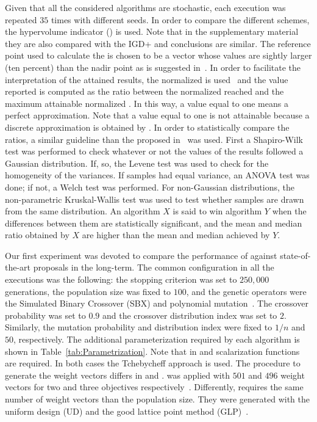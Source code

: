 Given that all the considered algorithms are stochastic, each execution was repeated $35$ times with different seeds.
%
In order to compare the different schemes, the hypervolume indicator (\HV{}) is used.
%
Note that in the supplementary material they are also compared with the IGD+ and conclusions are similar.
%
The reference point used to calculate the \HV{} is chosen to be a vector whose values are sightly larger (ten percent) than the nadir point 
as is suggested in~\cite{ishibuchi2017reference}.
%
In order to facilitate the interpretation of the attained results, the normalized \HV{} is used~\cite{li2015evolutionary}
and the value reported is computed as the ratio between the normalized \HV{} reached and the maximum attainable 
normalized \HV{}.
%
In this way, a value equal to one means a perfect approximation.
%
Note that a value equal to one is not attainable because a discrete approximation is obtained by \MOEAS{}.
%
In order to statistically compare the \HV{} ratios, a similar guideline than the proposed in~\cite{Joel:StatisticalTest} was used. 
%
First a Shapiro-Wilk test was performed to check whatever or not the values of the results followed a Gaussian distribution. 
%
If, so, the Levene test was used to check for the homogeneity of the variances. 
%
If samples had equal variance, an ANOVA test was done; if not, a Welch test was performed. 
%
For non-Gaussian distributions, the non-parametric Kruskal-Wallis test was used to test whether samples are drawn from the same distribution. 
%
An algorithm $X$ is said to win algorithm $Y$ when the differences between them are statistically significant, and the mean and median \HV{} ratio 
obtained by $X$ are higher than the mean and median achieved by $Y$.

Our first experiment was devoted to compare the performance of \VSDMOEA{} against state-of-the-art proposals in the long-term.
%
The common configuration in all the executions was the following: the stopping criterion was set to $250,000$ generations, 
the population size was fixed to $100$, and the genetic operators were the Simulated Binary Crossover (SBX) and polynomial 
mutation~\cite{Joel:SBX1994, Joel:Mutation}.
%
The crossover probability was set to $0.9$ and the crossover distribution index was set to $2$.
%
Similarly, the mutation probability and distribution index were fixed to $1/n$ and $50$, respectively.
%
The additional parameterization required by each algorithm is shown in Table~\ref{tab:Parametrization}.
%
Note that in \MOEAD{} and \RMOEA{} scalarization functions are required.
%
In both cases the Tchebycheff approach is used.
%
The procedure to generate the weight vectors differs in \MOEAD{} and \RMOEA{}.
%
\RMOEA{} was applied with $501$ and $496$ weight vectors for two and three objectives respectively~\cite{trautmann2013r2}.
%
Differently, \MOEAD{} requires the same number of weight vectors than the population size.
%
They were generated with the uniform design (UD) and the good lattice point method (GLP)~\cite{Joel:MOEAD_Uniform_Design, Joel:Kuhn_Munkres}.



